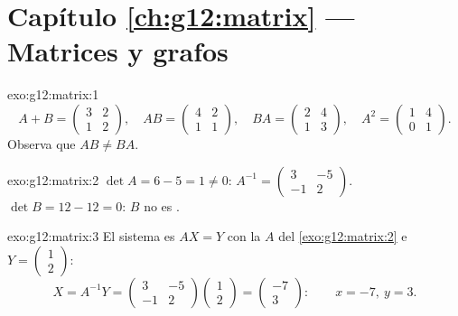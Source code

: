 \section*{Capítulo \ref{ch:g12:matrix} --- Matrices y grafos}

\begin{solution}{exo:g12:matrix:1}
\[
A + B = \begin{pmatrix} 3 & 2\\ 1 & 2\end{pmatrix}, \quad
AB = \begin{pmatrix} 4 & 2\\ 1 & 1\end{pmatrix}, \quad
BA = \begin{pmatrix} 2 & 4\\ 1 & 3\end{pmatrix}, \quad
A^2 = \begin{pmatrix} 1 & 4\\ 0 & 1\end{pmatrix}.
\]
Observa que $AB \neq BA$.
\end{solution}

\begin{solution}{exo:g12:matrix:2}
$\det A = 6 - 5 = 1 \neq 0$:
$A^{-1} = \begin{pmatrix} 3 & -5\\ -1 & 2 \end{pmatrix}$.
$\det B = 12 - 12 = 0$: $B$ no es .
\end{solution}

\begin{solution}{exo:g12:matrix:3}
El sistema es $AX = Y$ con la $A$ del \cref{exo:g12:matrix:2} e
$Y = \begin{pmatrix} 1\\ 2\end{pmatrix}$:
\[
X = A^{-1}Y = \begin{pmatrix} 3 & -5\\ -1 & 2\end{pmatrix}
\begin{pmatrix} 1\\ 2\end{pmatrix}
= \begin{pmatrix} -7\\ 3\end{pmatrix}:
\qquad x = -7,\ y = 3 .
\]
\end{solution}

